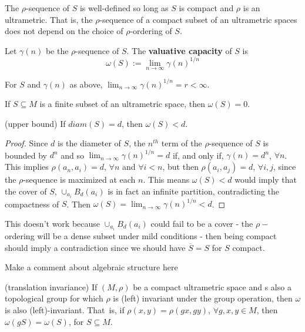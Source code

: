 \begin{proposition}
	\cite{kj} The $\rho$-sequence of $S$ is well-defined so long as $S$ is compact and $\rho$ is an ultrametric. That is, the $\rho$-sequence of a compact subset of an ultrametric spaces does not depend on the choice of $\rho$-ordering of $S$.
\end{proposition}

\begin{definition}
	\cite{kj}  Let $\gamma(n)$ be the $\rho$-sequence of $S$. The \textbf{valuative capacity} of $S$ is \[\omega(S)
	:= \lim_{n\to\infty} \gamma(n)^{1/n}\]  
\end{definition}


\begin{proposition}
	\cite{kj} For $S$ and $\gamma(n)$ as above,  $\lim_{n\to\infty} \gamma(n)^{1/n} = r < \infty$. 
\end{proposition}


\begin{proposition}
	If $S \subseteq M$ is a finite subset of an ultrametric space, then $\omega(S) =0$.
\end{proposition}


\begin{proposition}
	(upper bound) If $diam(S) = d$, then $\omega(S) < d$.
\end{proposition}

\begin{proof}
	Since $d$ is the diameter of $S$, the $n^{th}$ term of the $\rho$-sequence of $S$ is bounded by $d^n$ and so $ \lim_{n\to\infty} \gamma(n)^{1/n}=d$ if, and only if, $\gamma(n)=d^n$, $\forall n$. This implies $\rho(a_n, a_i) = d$, $\forall n$ and $\forall i < n$, but then $\rho(a_i,a_j)=d$, $\forall i,j$, since the $\rho$-sequence is maximized at each $n$. This means $\omega(S) < d$ would imply that the cover of $S$, $\cup_{a_i} B_d(a_i)$ is in fact an infinite partition, contradicting the compactness of $S$. Then  $\omega(S)= \lim_{n\to\infty} \gamma(n)^{1/n}<d$. 
\end{proof}

This doesn't work because  $\cup_{a_i} B_d(a_i)$  could fail to be a cover - the $\rho-$ ordering will be a dense subset under mild conditions - then being compact should imply a contradiction since we should have $\overline{S}=S$ for $S$ compact.

Make a comment about algebraic structure here

\begin{proposition}
\label{translation invariance}
	(translation invariance) If $(M, \rho)$ be a compact ultrametric space and s also a topological group for which $\rho$ is (left) invariant under the group operation, then $\omega$ is also (left)-invariant. That\ is, if $\rho(x,y)=\rho(gx,gy)$, $ \forall g,x,y \in M$, then $\omega(gS)=\omega(S)$, for $S \subseteq M$.	
\end{proposition}

